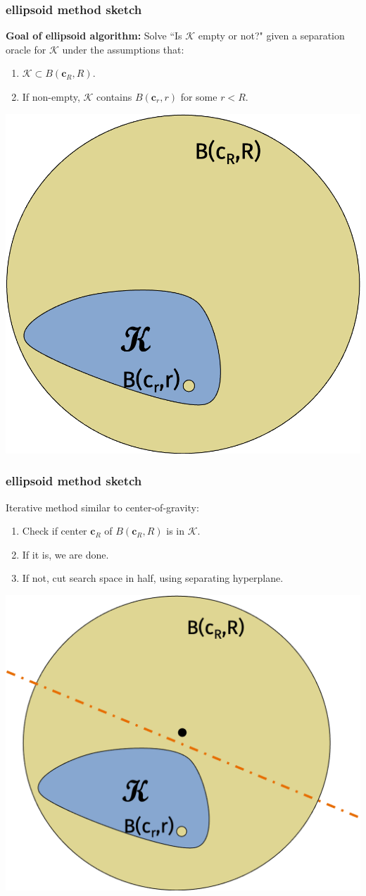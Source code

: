\documentclass[compress]{beamer}
\newcommand{\bv}[1]{\mathbf{#1}}
\begin{document}
\begin{frame}[t]
\frametitle{ellipsoid method sketch}
\textbf{Goal of ellipsoid algorithm:} Solve ``Is $\mathcal{K}$ empty or not?" given a separation oracle for $\mathcal{K}$ under the assumptions that:
\begin{enumerate}
	\item $\mathcal{K} \subset B(\bv{c}_R, R)$.
	\item If non-empty, $\mathcal{K}$ contains $B(\bv{c}_r, r)$ for some $r < R$. 
\end{enumerate}
\begin{center}
	\includegraphics[width=.5\textwidth]{ellipsoid0.png}
\end{center}
	
\end{frame}

\begin{frame}[t]
	\frametitle{ellipsoid method sketch}
	Iterative method similar to center-of-gravity:
	\begin{enumerate}
		\item Check if center $\bv{c}_R$ of $B(\bv{c}_R, R)$ is in $\mathcal{K}$.
		\item If it is, we are done.
		\item  If not, cut search space in half, using separating hyperplane. 
	\end{enumerate}
	\begin{center}
		\includegraphics[width=.5\textwidth]{ellipsoid1.png}
	\end{center}
\end{frame}
\end{document}
